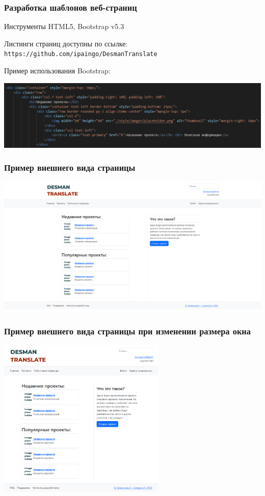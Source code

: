 \documentclass[hyperref={unicode}]{beamer}
\begin{document}
\begin{frame}
	\frametitle{Разработка шаблонов веб-страниц}
	\begin{block}{Инструменты}
		HTML5, Bootstrap v5.3
	\end{block}
	Листинги страниц доступны по ссылке:\\
	\texttt{https://github.com/ipaingo/DesmanTranslate}
	
	Пример использования Bootstrap:\\
	\begin{center}
	\includegraphics[width=\textwidth]{images/code.png}
	\end{center}

\end{frame}


\begin{frame}
	\frametitle{Пример внешнего вида страницы}
	\begin{center}
	\includegraphics[width=\textwidth]{images/index.png}
	\end{center}
\end{frame}


\begin{frame}
	\frametitle{Пример внешнего вида страницы при изменении размера окна}
	\begin{center}
	\includegraphics[width=0.6\textwidth]{images/smallindex.png}
	\end{center}
\end{frame}
\end{document}
